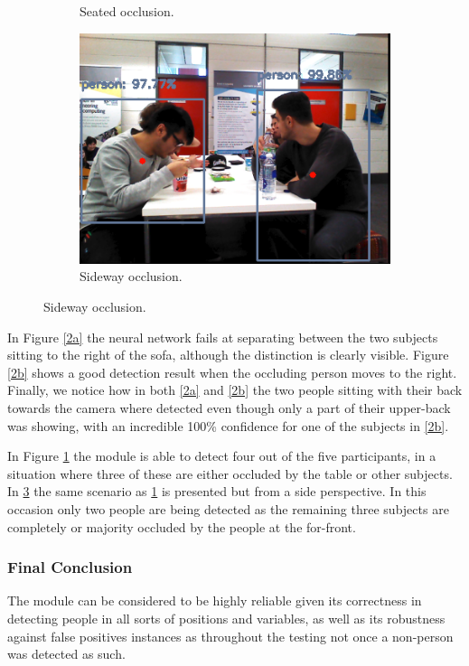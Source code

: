 \begin{figure}[H]
\begin{subfigure}{.5\textwidth}
        \caption{Seated occlusion.}
        \label{2c}
	\end{subfigure}
    \begin{subfigure}{.5\textwidth}
        \centering
        \includegraphics[width=.9\linewidth]{images/chapter6_occlusion_table_side.png}
        \caption{Sideway occlusion.}
        \label{2d}
	\end{subfigure}
\end{figure}

In Figure \ref{2a} the neural network fails at separating between the two subjects sitting to the right of the sofa, although the distinction is clearly visible. Figure \ref{2b} shows a good detection result when the occluding person moves to the right. Finally, we notice how in both \ref{2a} and \ref{2b} the two people sitting with their back towards the camera where detected even though only a part of their upper-back was showing, with an incredible 100\% confidence for one of the subjects in \ref{2b}.

In Figure \ref{2c} the module is able to detect four out of the five participants, in a situation where three of these are either occluded by the table or other subjects. In \ref{2d} the same scenario as \ref{2c} is presented but from a side perspective. In this occasion only two people are being detected as the remaining three subjects are completely or majority occluded by the people at the for-front.

\subsubsection{Final Conclusion}

The module can be considered to be highly reliable given its correctness in detecting people in all sorts of positions and variables, as well as its robustness against false positives instances as throughout the testing not once a non-person was detected as such.

